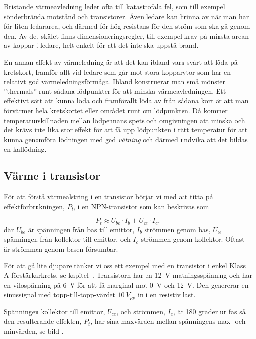 Bristande värmeavledning leder ofta till katastrofala fel, som till exempel
sönderbrända motstånd och transistorer. Även ledare kan brinna av när man
har för liten ledararea, och därmed för hög resistans för den ström som
ska gå genom den. Av det skälet finns dimensioneringsregler, till exempel
krav på minsta arean av koppar i ledare, helt enkelt för att det inte ska
uppstå brand.

En annan effekt av värmeledning är att det kan ibland vara svårt att löda
på kretskort, framför allt vid ledare som går mot stora kopparytor som
har en relativt god värmeledningsförmåga. Ibland konstruerar man små mönster
''thermals'' runt sådana lödpunkter för att minska värmeavledningen.
Ett effektivt sätt att kunna löda och framförallt löda av från sådana
kort är att man förvärmer hela kretskortet eller området runt om
lödpunkten.
Då kommer temperaturskillnaden mellan lödpennans spets och omgivningen att
minska och det krävs inte lika stor effekt för att få upp lödpunkten i rätt
temperatur för att kunna genomföra lödningen med god \emph{vätning} och därmed
undvika att det bildas en kallödning.

\subsection{Värme i transistor}


För att förstå värmealstring i en transistor börjar vi med att titta
på effektförbrukningen, \(P_t\), i en NPN-transistor som kan beskrivas
som

\[P_t \approx U_{be}\cdot I_b + U_{ce}\cdot I_c,\]
%
där \(U_{be}\) är spänningen från bas till emittor, \(I_b\)
strömmen genom bas,  \(U_{ce}\) spänningen från kollektor till
emittor, och \(I_c\) strömmen genom kollektor.
Oftast är strömmen genom basen försumbar.

För att gå lite djupare tänker vi oss ett exempel med en transistor i
enkel Klass A förstärkarkrets, se kapitel~.
Transistorn har en \qty{12}{\volt} matningsspänning och har en
vilospänning på \qty{6}{\volt} för att få marginal mot \qty{0}{\volt}
och \qty{+12}{\volt}.
Den genererar en sinussignal med topp-till-topp-värdet \(10\ V_{pp}\)
in i en resistiv last.

Spänningen kollektor till emittor, \(U_{ce}\), och strömmen, \(I_c\),
är 180 grader ur fas så den resulterande effekten, \(P_t\), har sina
maxvärden mellan spänningens max- och minvärden, se bild
.
